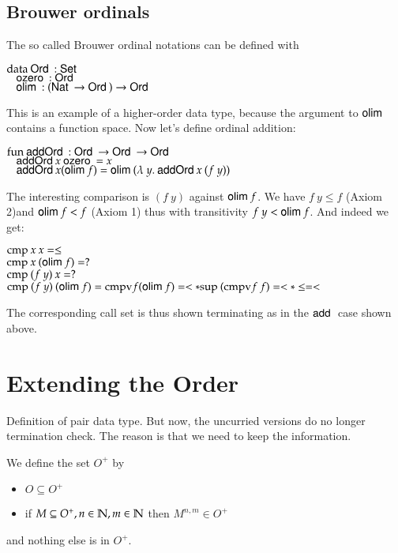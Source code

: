 \subsection{Brouwer ordinals}
The so called Brouwer ordinal notations can be defined with
\begin{bsp}
$\mathrm{data}\: \mathsf{Ord}\: : \mathsf{Set}$ \\
$\hspace*{3mm} \mathsf{ozero}\: : \mathsf{Ord}\: $\\
$\hspace*{3mm} \mathsf{olim}\: : (\mathsf{Nat}\: \rightarrow \mathsf{Ord}\: ) \rightarrow \mathsf{Ord}\: $
\end{bsp}
This is an example of a higher-order data type, because the argument to $\mathsf{olim}\:$ contains a function space.
Now let's define ordinal addition:
\begin{bsp}
$\mathrm{fun}\: \mathsf{addOrd}\: : \mathsf{Ord}\: \rightarrow \mathsf{Ord}\: \rightarrow \mathsf{Ord}\:$\\
$\hspace*{3mm} \mathsf{addOrd}\: x \: \mathsf{ozero}\: = x $\\
$\hspace*{3mm} \mathsf{addOrd}\: x (\mathsf{olim}\: f) = \mathsf{olim}\: ( \lambda\: y .\: \mathsf{addOrd}\:  x \: (f \: y))  $
\end{bsp}
The interesting comparison is $(f \: y)$ against $\mathsf{olim}\: f$.
We have  $f \: y \leq f$ (Axiom 2)and $\mathsf{olim}\: f < f $ (Axiom 1) thus with transitivity $ f\: y < \mathsf{olim}\: f$.
And indeed we get:
\begin{bsp}
$\mathrm{cmp}\: x \: x = \leq $\\
$\mathrm{cmp}\: x \: (\mathsf{olim}\: f) = ? $\\
$\mathrm{cmp}\: (f \: y) \: x = ? $\\
$\mathrm{cmp}\: (f \: y) \: (\mathsf{olim}\: f) = \mathrm{cmpv} f (\mathsf{olim}\: f) = < * \mathrm{sup}\: (\mathrm{cmpv} f \: f) = < * \leq = < $ 
\end{bsp}
The corresponding call set is thus shown terminating as in the $\mathsf{add}\:$ case shown above.
\section{Extending the Order}
Definition of pair data type.
But now, the uncurried versions do no longer termination check.
The reason is that we need to keep the information.

\newcommand{\coll}{\mathrm{collapse}\:}

\begin{definition}
We define the set $O^{+}$ by   
\begin{itemize}
\item
$ O \subseteq O^{+}$
\item
if $ M \subseteq O^{+} , n \in \mathbb{N} , m \in \mathbb{N} $ then $M^{n,m} \in O^{+}$
\end{itemize}
and nothing else is in $O^{+}$.
\end{definition}

